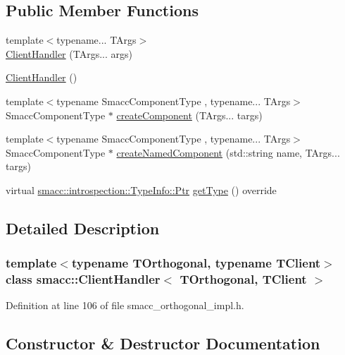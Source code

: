 \subsection*{Public Member Functions}
\begin{DoxyCompactItemize}
\item 
{\footnotesize template$<$typename... T\+Args$>$ }\\\hyperlink{classsmacc_1_1ClientHandler_a5f92ec0fcc8bf24d2d5ef6eb60e987d7}{Client\+Handler} (T\+Args... args)
\item 
\hyperlink{classsmacc_1_1ClientHandler_a73f354900b489edacad7ccb411c272da}{Client\+Handler} ()
\item 
{\footnotesize template$<$typename Smacc\+Component\+Type , typename... T\+Args$>$ }\\Smacc\+Component\+Type $\ast$ \hyperlink{classsmacc_1_1ClientHandler_a4a9adad4c37104586c9b595d9030bb3c}{create\+Component} (T\+Args... targs)
\item 
{\footnotesize template$<$typename Smacc\+Component\+Type , typename... T\+Args$>$ }\\Smacc\+Component\+Type $\ast$ \hyperlink{classsmacc_1_1ClientHandler_a33f440a8e06038df0dd291d2ea278f39}{create\+Named\+Component} (std\+::string name, T\+Args... targs)
\item 
virtual \hyperlink{classsmacc_1_1introspection_1_1TypeInfo_aa6ffd9c39811d59f7c771941b7fad860}{smacc\+::introspection\+::\+Type\+Info\+::\+Ptr} \hyperlink{classsmacc_1_1ClientHandler_a018a50262de782c479414cf18daddac9}{get\+Type} () override
\end{DoxyCompactItemize}


\subsection{Detailed Description}
\subsubsection*{template$<$typename T\+Orthogonal, typename T\+Client$>$\newline
class smacc\+::\+Client\+Handler$<$ T\+Orthogonal, T\+Client $>$}



Definition at line 106 of file smacc\+\_\+orthogonal\+\_\+impl.\+h.



\subsection{Constructor \& Destructor Documentation}
\mbox{\label{classsmacc_1_1ClientHandler_a5f92ec0fcc8bf24d2d5ef6eb60e987d7}} 
